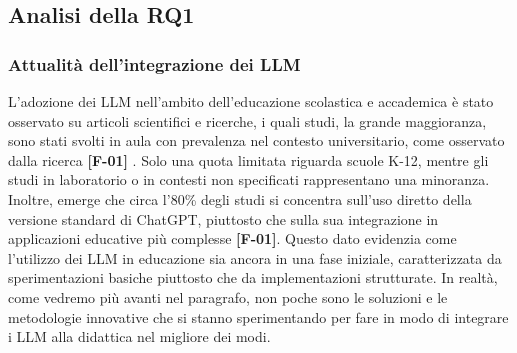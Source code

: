 \documentclass[a4paper,9pt]{article}
\begin{document}
\subsection{Analisi della RQ1}

\subsubsection{{Attualità dell'integrazione dei LLM}} 
L'adozione dei LLM nell'ambito dell'educazione scolastica e accademica è stato osservato su articoli scientifici e ricerche, i quali studi, la grande maggioranza, sono stati svolti in aula con prevalenza nel contesto universitario, come osservato dalla ricerca \textbf{[F-01]} . Solo una quota limitata riguarda scuole K-12, mentre gli studi in laboratorio o in contesti non specificati rappresentano una minoranza. Inoltre, emerge che circa l’80\% degli studi si concentra sull’uso diretto della versione standard di ChatGPT, piuttosto che sulla sua integrazione in applicazioni educative più complesse \textbf{[F-01]}. Questo dato evidenzia come l’utilizzo dei LLM in educazione sia ancora in una fase iniziale, caratterizzata da sperimentazioni basiche piuttosto che da implementazioni strutturate. In realtà, come vedremo più avanti nel paragrafo, non poche sono le soluzioni e le metodologie innovative che si stanno sperimentando per fare in modo di integrare i LLM alla didattica nel migliore dei modi. \\
\end{document}
